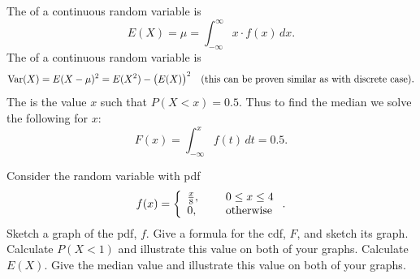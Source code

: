 \begin{tcolorbox}
\bi
\ii The  of a continuous random variable is\label{def:mean}
\[ E(X) = \mu = \int_{-\infty}^{\infty} x \cdot f(x) \, dx.\]
\ii The  of a continuous random variable is\label{def:variance}
\[ \mbox{Var}(X) = E(X-\mu)^2 = E(X^2) - \big( E(X) \big)^2  \ \ \ \mbox{(this can be proven similar as with discrete case)}.\] 
\ii The  is the value $x$ such that $P(X < x) = 0.5$. Thus to find the median we solve the following for $x$:\label{def:median}
\[ F(x) = \int_{-\infty}^x f(t) \, dt = 0.5.\]
\ei
\end{tcolorbox}

\clearpage


\bb[resume]
\ii Consider the random variable with pdf
\[ f(x) = \left\{ \begin{array}{ll} \frac{x}{8}, & \hspace{0.2in} 0 \leq x \leq 4 \\ 0, &  \hspace{0.2in} \mbox{otherwise} \end{array} \right. .\]
\bb
\ii Sketch a graph of the pdf, $f$. \vfill
\ii Give a formula for the cdf, $F$, and sketch its graph. \vspace{1in}
\ii Calculate $P(X < 1)$ and illustrate this value on both of your graphs. \vspace{1in}
\ii Calculate $E(X)$. \vspace{1in}
\ii Give the median value and illustrate this value on both of your graphs. \vfill
\ee
\ee

